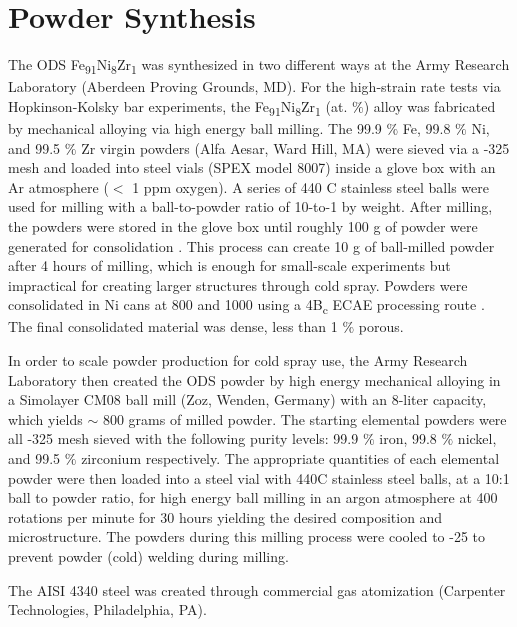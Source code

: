 
\section*{Powder Synthesis}


	
	The ODS Fe\textsubscript{91}Ni\textsubscript{8}Zr\textsubscript{1 }was synthesized in two different ways at the Army Research Laboratory (Aberdeen Proving Grounds, MD). For the high-strain rate tests via Hopkinson-Kolsky bar experiments, the Fe\textsubscript{91}Ni\textsubscript{8}Zr\textsubscript{1} (at. $\%$) alloy was fabricated by mechanical alloying via high energy ball milling. The 99.9 $\%$  Fe, 99.8 $\%$  Ni, and 99.5 $\%$  Zr virgin powders (Alfa Aesar, Ward Hill, MA) were sieved via a -325 mesh and loaded into steel vials (SPEX model 8007) inside a glove box with an Ar atmosphere ($<$ 1 ppm oxygen). A series of 440 C stainless steel balls were used for milling with a ball-to-powder ratio of 10-to-1 by weight. After milling, the powders were stored in the glove box until roughly 100 g of powder were generated for consolidation \cite{RN740}. This process can create 10 g of ball-milled powder after 4 hours of milling, which is enough for small-scale experiments but impractical for creating larger structures through cold spray. Powders were consolidated in Ni cans at 800 \celsius{} and 1000 \celsius{} using a 4B\textsubscript{c} ECAE processing route \cite{RN140}. The final consolidated material was dense, less than 1 $\%$  porous.
	
	In order to scale powder production for cold spray use, the Army Research Laboratory then created the ODS powder by high energy mechanical alloying in a Simolayer CM08 ball mill (Zoz, Wenden, Germany) with an 8-liter capacity, which yields $ \sim $  800 grams of milled powder. The starting elemental powders were all -325 mesh sieved with the following purity levels: 99.9 $\%$  iron, 99.8 $\%$  nickel, and 99.5 $\%$  zirconium respectively. The appropriate quantities of each elemental powder were then loaded into a steel vial with 440C stainless steel balls, at a 10:1 ball to powder ratio, for high energy ball milling in an argon atmosphere at 400 rotations per minute for 30 hours yielding the desired composition and microstructure. The powders during this milling process were cooled to -25 \celsius{} to prevent powder (cold) welding during milling. 

	The AISI 4340 steel was created through commercial gas atomization (Carpenter Technologies, Philadelphia, PA). 


